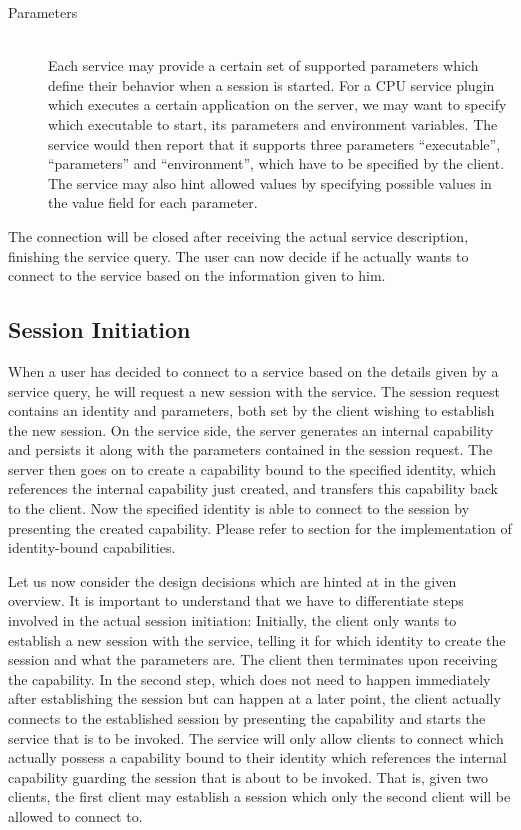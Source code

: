 \begin{description}
    \item[Parameters]\hfill\\
        Each service may provide a certain set of supported parameters which define their behavior when a session is started.
        For a CPU service plugin which executes a certain application on the server, we may want to specify which executable to start, its parameters and environment variables.
        The service would then report that it supports three parameters ``executable'', ``parameters'' and ``environment'', which have to be specified by the client.
        The service may also hint allowed values by specifying possible values in the value field for each parameter.
\end{description}

The connection will be closed after receiving the actual service description, finishing the service query.
The user can now decide if he actually wants to connect to the service based on the information given to him.

\subsection{Session Initiation}
\label{sec:session-initiation}

When a user has decided to connect to a service based on the details given by a service query, he will request a new session with the service.
The session request contains an identity and parameters, both set by the client wishing to establish the new session.
On the service side, the server generates an internal capability and persists it along with the parameters contained in the session request.
The server then goes on to create a capability bound to the specified identity, which references the internal capability just created, and transfers this capability back to the client.
Now the specified identity is able to connect to the session by presenting the created capability.
Please refer to section \label{sec:capabilities} for the implementation of identity-bound capabilities.

Let us now consider the design decisions which are hinted at in the given overview.
It is important to understand that we have to differentiate steps involved in the actual session initiation:
Initially, the client only wants to establish a new session with the service, telling it for which identity to create the session and what the parameters are.
The client then terminates upon receiving the capability.
In the second step, which does not need to happen immediately after establishing the session but can happen at a later point, the client actually connects to the established session by presenting the capability and starts the service that is to be invoked.
The service will only allow clients to connect which actually possess a capability bound to their identity which references the internal capability guarding the session that is about to be invoked.
That is, given two clients, the first client may establish a session which only the second client will be allowed to connect to.

